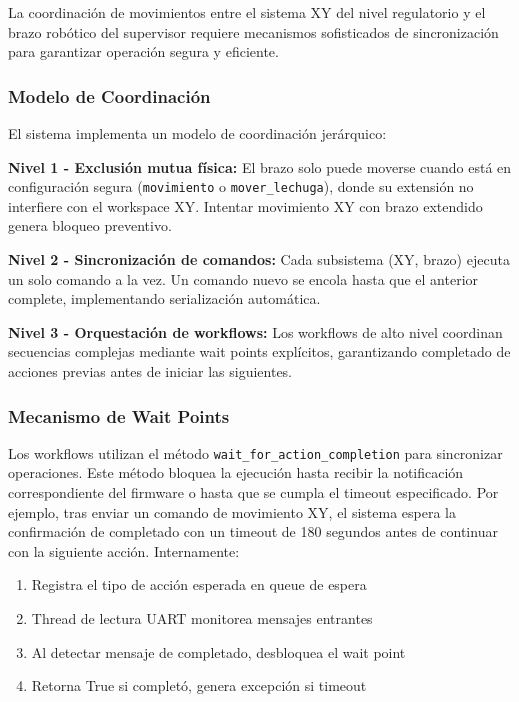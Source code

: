 La coordinación de movimientos entre el sistema XY del nivel regulatorio y el brazo robótico del supervisor requiere mecanismos sofisticados de sincronización para garantizar operación segura y eficiente.

\subsubsection{Modelo de Coordinación}

El sistema implementa un modelo de coordinación jerárquico:

\textbf{Nivel 1 - Exclusión mutua física:} El brazo solo puede moverse cuando está en configuración segura (\texttt{movimiento} o \texttt{mover\_lechuga}), donde su extensión no interfiere con el workspace XY. Intentar movimiento XY con brazo extendido genera bloqueo preventivo.

\textbf{Nivel 2 - Sincronización de comandos:} Cada subsistema (XY, brazo) ejecuta un solo comando a la vez. Un comando nuevo se encola hasta que el anterior complete, implementando serialización automática.

\textbf{Nivel 3 - Orquestación de workflows:} Los workflows de alto nivel coordinan secuencias complejas mediante wait points explícitos, garantizando completado de acciones previas antes de iniciar las siguientes.

\subsubsection{Mecanismo de Wait Points}

Los workflows utilizan el método \texttt{wait\_for\_action\_completion} para sincronizar operaciones. Este método bloquea la ejecución hasta recibir la notificación correspondiente del firmware o hasta que se cumpla el timeout especificado. Por ejemplo, tras enviar un comando de movimiento XY, el sistema espera la confirmación de completado con un timeout de 180 segundos antes de continuar con la siguiente acción. Internamente:

\begin{enumerate}
    \item Registra el tipo de acción esperada en queue de espera
    \item Thread de lectura UART monitorea mensajes entrantes
    \item Al detectar mensaje de completado, desbloquea el wait point
    \item Retorna True si completó, genera excepción si timeout
\end{enumerate}

